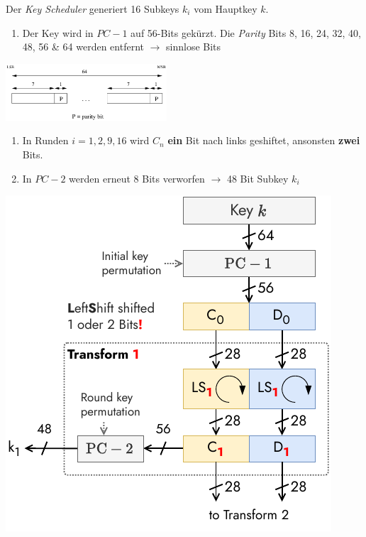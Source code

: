 \documentclass[
  10pt,
  a4paper,
  twocolumn]{article}
\providecommand{\tightlist}{%
  \setlength{\itemsep}{0pt}\setlength{\parskip}{0pt}}\usepackage{longtable,booktabs,array}
\begin{document}
Der \emph{Key Scheduler} generiert 16 Subkeys \(k_i\) vom Hauptkey
\(k\).

\begin{enumerate}
\def\labelenumi{\arabic{enumi}.}
\tightlist
\item
  Der Key wird in \(PC-1\) auf 56-Bits gekürzt. Die \emph{Parity} Bits
  8, 16, 24, 32, 40, 48, 56 \& 64 werden entfernt \(\rightarrow\)
  sinnlose Bits
\end{enumerate}

\begin{center}
\includegraphics[width=6cm,height=\textheight]{images/crypto/initial_key_permutation.png}
\end{center}

\begin{enumerate}
\def\labelenumi{\arabic{enumi}.}
\setcounter{enumi}{1}
\item
  In Runden \(i=1,2,9,16\) wird \(C_n\) \textbf{ein} Bit nach links
  geshiftet, ansonsten \textbf{zwei} Bits.
\item
  In \(PC-2\) werden erneut 8 Bits verworfen \(\rightarrow\) 48 Bit
  Subkey \(k_i\)
\end{enumerate}

\begin{center}
\includegraphics{images/crypto/keyscheduler.pdf}
\end{center}
\end{document}

